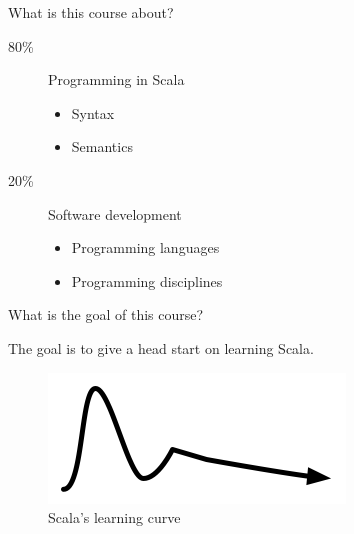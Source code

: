 \begin{frame}{What is this course about?}
\begin{description}
\item[80\%] Programming in Scala
\begin{itemize}
	\item Syntax
	\item Semantics
\end{itemize}
\pause
\item[20\%] Software development
\begin{itemize}
 	\item Programming languages
 	\item Programming disciplines
\end{itemize}
\end{description}
\end{frame}
\begin{frame}{What is the goal of this course?}
\begin{center}
The goal is to give a head start on learning Scala.
\pause
\begin{figure}[ht]
	\centering
  \includegraphics{resources/ScalaComplexity.png}
	\\Scala's learning curve
\end{figure}
\end{center}
\end{frame}